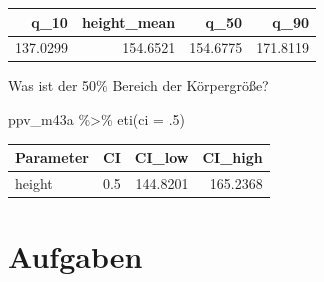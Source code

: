 \documentclass[
  a4paper,
  DIV=11]{scrreprt}
\newenvironment{Shaded}{\begin{snugshade}}{\end{snugshade}}
\newcommand{\AttributeTok}[1]{\textcolor[rgb]{0.40,0.45,0.13}{#1}}
\newcommand{\DecValTok}[1]{\textcolor[rgb]{0.68,0.00,0.00}{#1}}
\newcommand{\FunctionTok}[1]{\textcolor[rgb]{0.28,0.35,0.67}{#1}}
\newcommand{\NormalTok}[1]{\textcolor[rgb]{0.00,0.23,0.31}{#1}}
\newcommand{\SpecialCharTok}[1]{\textcolor[rgb]{0.37,0.37,0.37}{#1}}
\theoremstyle{definition}
\theoremstyle{remark}
\begin{document}
\begin{longtable}[]{@{}rrrr@{}}
\toprule()
q\_10 & height\_mean & q\_50 & q\_90 \\
\midrule()
\endhead
137.0299 & 154.6521 & 154.6775 & 171.8119 \\
\bottomrule()
\end{longtable}

Was ist der 50\% Bereich der Körpergröße?

\begin{Shaded}
\begin{Highlighting}[]
\NormalTok{ppv\_m43a }\SpecialCharTok{\%\textgreater{}\%} 
  \FunctionTok{eti}\NormalTok{(}\AttributeTok{ci =}\NormalTok{ .}\DecValTok{5}\NormalTok{)}
\end{Highlighting}
\end{Shaded}

\begin{longtable}[]{@{}lrrr@{}}
\toprule()
Parameter & CI & CI\_low & CI\_high \\
\midrule()
\endhead
height & 0.5 & 144.8201 & 165.2368 \\
\bottomrule()
\end{longtable}

\hypertarget{aufgaben-7}{%
\section{Aufgaben}\label{aufgaben-7}}
\end{document}
